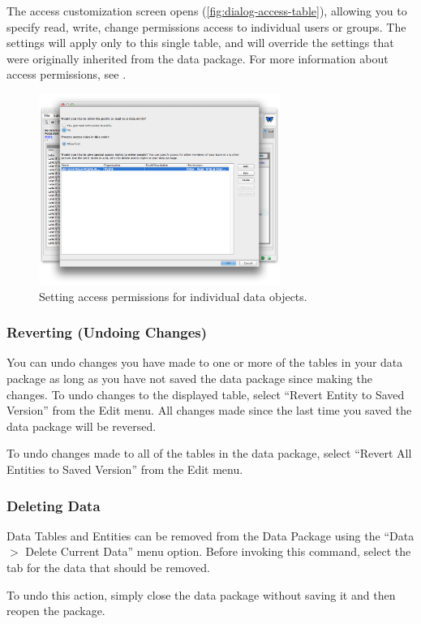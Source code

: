 The access customization screen opens
(\autoref{fig:dialog-access-table}), allowing you to specify read,
write, change permissions access to individual users or groups. 
The settings will apply only to this single table, and will override
the settings that were originally inherited from the data package. For more
information about access permissions, see
.

\begin{figure}
  \centering
    \includegraphics[width=0.7\textwidth]{images/dialog-access-table.png}
  \caption{Setting access permissions for individual data objects.}
  \label{fig:dialog-access-table}
\end{figure}

\subsubsection{Reverting (Undoing Changes)}
\label{sec:edit-table-revert}

You can undo changes you have made to one or more of the tables in your
data package as long as you have not saved the data package since making
the changes. To undo changes to the displayed table, select ``Revert
Entity to Saved Version'' from the Edit menu. All changes made since the
last time you saved the data package will be reversed. 

To undo changes made to all of the tables in the data package, select
``Revert All Entities to Saved Version'' from the Edit menu.

\subsubsection{Deleting Data}
\label{sec:deleting-current-data}

Data Tables and Entities can be removed from the Data Package 
using the ``Data $>$ Delete Current Data'' menu option. Before invoking 
this command, select the tab for the data that should be removed.

To undo this action, simply close the data package without saving it 
and then reopen the package.
